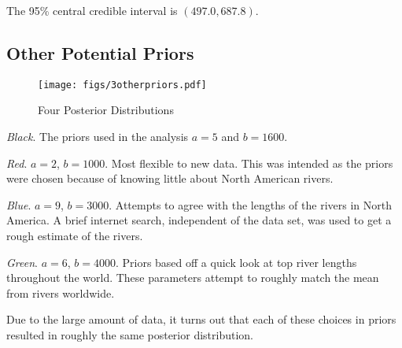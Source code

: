 \documentclass[12pt]{article}
\begin{document}
\noindent The 95\% central credible interval is $(497.0, 687.8)$.

\subsection{Other Potential Priors}

\begin{figure}[H]
\begin{center}
\texttt{[image: figs/3otherpriors.pdf]}
\caption{Four Posterior Distributions}
\end{center}
\end{figure}

\noindent \emph{Black}.  The priors used in the analysis $a=5$ and $b=1600$.

\noindent \emph{Red}. $a=2$, $b=1000$.  Most flexible to new data.  This was intended as the priors were chosen because of knowing little about North American rivers.

\noindent \emph{Blue}. $a=9$, $b=3000$.  Attempts to agree with the lengths of the rivers in North America.  A brief internet search, independent of the data set, was used to get a rough estimate of the rivers.

\noindent \emph{Green}. $a=6$, $b=4000$.  Priors based off a quick look at top river lengths throughout the world.  These parameters attempt to roughly match the mean from rivers worldwide.
\bigskip

\noindent Due to the large amount of data, it turns out that each of these choices in priors resulted in roughly the same posterior distribution.

%
%
%
\end{document}

